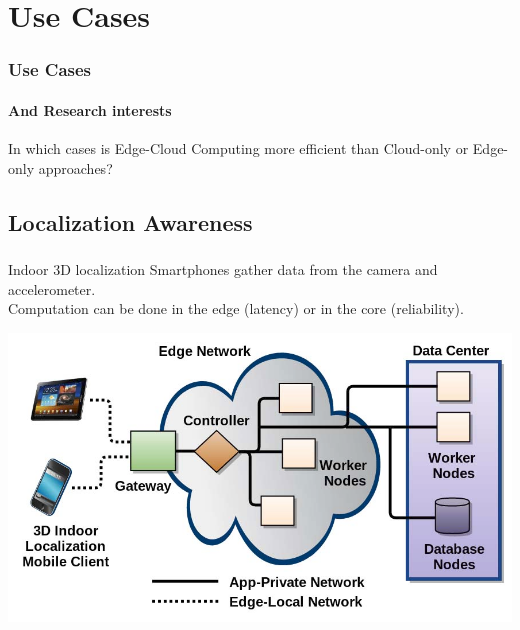 \documentclass[utf8,xcolor=table, page number]{earlywinter}
\begin{document}
\section{Use Cases}

\begin{frame}
  \frametitle{Use Cases}
  \framesubtitle{And Research interests}

  \begin{block}{}
    In which cases is Edge-Cloud Computing more efficient than Cloud-only or Edge-only approaches?
  \end{block}

\end{frame}

\subsection{Localization Awareness}
\begin{frame}
  \frametitle{\secname}
  \framesubtitle{\subsecname}

  \begin{exampleblock}{Indoor 3D localization}
    Smartphones gather data from the camera and accelerometer.\\
    Computation can be done in the edge (latency) or in the core (reliability).
  \end{exampleblock}

  \begin{center}
  \includegraphics[scale=0.2]{indoor}
  \end{center}

  

\end{frame}
\end{document}
